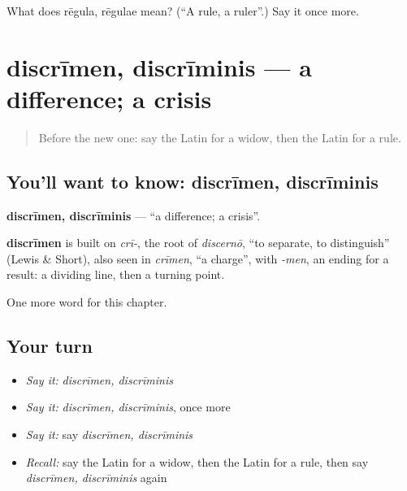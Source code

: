 \begin{tcolorbox}[breakable,colback=teal!4,colframe=teal!35!black,title={Before you move on}]
What does rēgula, rēgulae mean? (\textquotedblleft{}A rule, a ruler\textquotedblright{}.) Say it once more.
\end{tcolorbox}
\section[discrīmen, discrīminis]{discrīmen, discrīminis — a difference; a crisis}

\label{lesson:LA-C221-discrimen}



\begin{quote}
Before the new one: say the Latin for a widow, then the Latin for a rule.
\end{quote}

\subsection*{You'll want to know: discrīmen, discrīminis}
\textbf{discrīmen, discrīminis} — \textquotedblleft{}a difference; a crisis\textquotedblright{}.

\begin{cousinweb}
\textbf{discrīmen} is built on \emph{crī-}, the root of \emph{discernō}, \textquotedblleft{}to separate, to distinguish\textquotedblright{} (Lewis \& Short), also seen in \emph{crīmen}, \textquotedblleft{}a charge\textquotedblright{}, with \emph{-men}, an ending for a result: a dividing line, then a turning point.
\end{cousinweb}

\begin{grammarlens}[title={What you've built}]
One more word for this chapter.
\end{grammarlens}

\subsection*{Your turn}
\begin{itemize}
\raggedright
  \item \emph{Say it:} \emph{discrīmen, discrīminis}
  \item \emph{Say it:} \emph{discrīmen, discrīminis}, once more
  \item \emph{Say it:} say \emph{discrīmen, discrīminis}
  \item \emph{Recall:} say the Latin for a widow, then the Latin for a rule, then say \emph{discrīmen, discrīminis} again
\end{itemize}

